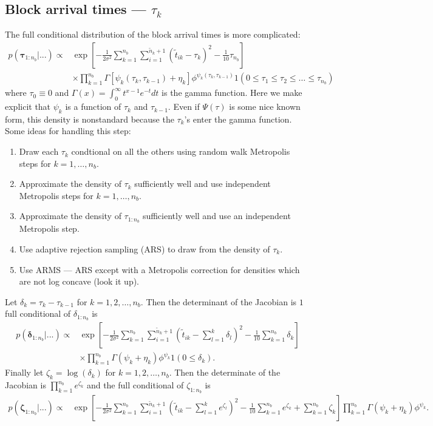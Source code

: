 \documentclass{article}
\begin{document}
\subsection{Block arrival times --- $\tau_k$}
The full conditional distribution of the block arrival times is more complicated:
\begin{align*}
p(\bm{\tau}_{1:n_{b}}|...) \propto & \exp\left[-\frac{1}{2\sigma^2}\sum_{k=1}^{n_{b}}\sum_{i=1}^{\tilde{n}_k+1}\left(\tilde{t}_{ik} - \tau_k\right)^2 - \frac{1}{10}\tau_{n_{b}}\right]\\
&\times \prod_{k=1}^{n_b}\Gamma[\psi_k(\tau_{k}, \tau_{k-1}) + \eta_k]\phi^{\psi_k(\tau_k,\tau_{k-1})}1(0\le \tau_1 \le \tau_2 \le \hdots \le \tau_{n_b})
\end{align*}
where $\tau_0\equiv0$ and $\Gamma(x) = \int_0^\infty t^{x-1}e^{-t}dt$ is the gamma function. Here we make explicit that $\psi_k$ is a function of $\tau_k$ and $\tau_{k-1}$. Even if $\Psi(\tau)$ is some nice known form, this density is nonstandard because the $\tau_k$'s enter the gamma function. Some ideas for handling this step:
\begin{enumerate}
\item Draw each $\tau_k$ condtional on all the others using random walk Metropolis steps for $k=1,\dots,n_{b}$.
\item Approximate the density of $\tau_k$ sufficiently well and use independent Metropolis steps for $k=1,\dots,n_{b}$.
\item Approximate the density of $\tau_{1:n_{b}}$ sufficiently well and use an independent Metropolis step.
\item Use adaptive rejection sampling (ARS) to draw from the density of $\tau_k$.
\item Use ARMS --- ARS except with a Metropolis correction for densities which are not log concave (look it up).
\end{enumerate}

Let $\delta_k = \tau_k - \tau_{k-1}$ for $k=1,2,\dots,n_b$. Then the determinant of the Jacobian is $1$ full conditional of $\delta_{1:n_b}$ is
\begin{align*}
p(\bm{\delta}_{1:n_{b}}|...) \propto & \exp\left[-\frac{1}{2\sigma^2}\sum_{k=1}^{n_{b}}\sum_{i=1}^{\tilde{n}_k+1}\left(\tilde{t}_{ik} - \sum_{l=1}^k\delta_l\right)^2 - \frac{1}{10}\sum_{k=1}^{n_b}\delta_{k}\right]\\
&\times \prod_{k=1}^{n_b}\Gamma(\psi_k + \eta_k)\phi^{\psi_k}1(0\le \delta_k).
\end{align*}
Finally let $\zeta_k = \log(\delta_k)$ for $k = 1, 2, \dots, n_b$. Then the determinate of the Jacobian is $\prod_{k=1}^{n_b}e^{\zeta_k}$ and the full conditional of $\zeta_{1:n_b}$ is
\begin{align*}
p(\bm{\zeta}_{1:n_{b}}|...) \propto & \exp\left[-\frac{1}{2\sigma^2}\sum_{k=1}^{n_{b}}\sum_{i=1}^{\tilde{n}_k+1}\left(\tilde{t}_{ik} - \sum_{l=1}^ke^{\zeta_l}\right)^2 - \frac{1}{10}\sum_{k=1}^{n_b}e^{\zeta_k} + \sum_{k=1}^{n_b}{\zeta_k}\right] \prod_{k=1}^{n_b}\Gamma(\psi_k + \eta_k)\phi^{\psi_k}.
\end{align*}
\end{document}
